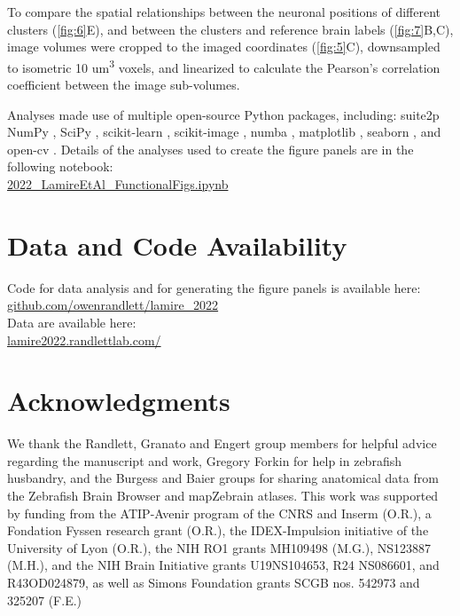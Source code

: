 \documentclass[9pt,lineno]{RandlettLab_elife}
\begin{document}
To compare the spatial relationships between the neuronal positions of different clusters (\autoref{fig:6}E), and between the clusters and reference brain labels (\autoref{fig:7}B,C), image volumes were cropped to the imaged coordinates (\autoref{fig:5}C), downsampled to isometric 10 um\textsuperscript{3} voxels, and linearized to calculate the Pearson's correlation coefficient between the image sub-volumes. 

Analyses made use of multiple open-source Python packages, including:
suite2p \cite{Pachitariu2017-ad}
NumPy \cite{Harris2020-bg}, SciPy \cite{Virtanen2020-sz}, scikit-learn \cite{Pedregosa2011-dj}, scikit-image \cite{Van_der_Walt2014-hx}, numba \cite{Lam2015-pq}, matplotlib \cite{Hunter2007-ub}, seaborn \cite{Waskom2021-ah}, and open-cv \cite{Bradski2000-qo}.
 Details of the analyses used to create the figure panels are in the following notebook: 
 \\ \href{https://nbviewer.org/github/owenrandlett/lamire_2022/blob/main/2022_LamireEtAl_FunctionalFigs.ipynb}{2022\_LamireEtAl\_FunctionalFigs.ipynb}

\section{Data and Code Availability}

Code for data analysis and for generating the figure panels is available here: \\
\href{https://github.com/owenrandlett/lamire_2022}{github.com/owenrandlett/lamire\_2022} \\
Data are available here: \\
\href{http://lamire2022.randlettlab.com/}{lamire2022.randlettlab.com/} 

\section{Acknowledgments}

We thank the Randlett, Granato and Engert group members for helpful advice regarding the manuscript and work, Gregory Forkin for help in zebrafish husbandry, and the Burgess and Baier groups for sharing anatomical data from the Zebrafish Brain Browser and mapZebrain atlases. This work was supported by funding from the ATIP-Avenir program of the CNRS and Inserm (O.R.), a Fondation Fyssen research grant (O.R.), the IDEX-Impulsion initiative of the University of Lyon (O.R.), the NIH RO1 grants MH109498 (M.G.), NS123887 (M.H.), and the NIH Brain Initiative grants U19NS104653, R24 NS086601, and R43OD024879, as well as Simons Foundation grants SCGB nos. 542973 and 325207 (F.E.)
\end{document}
